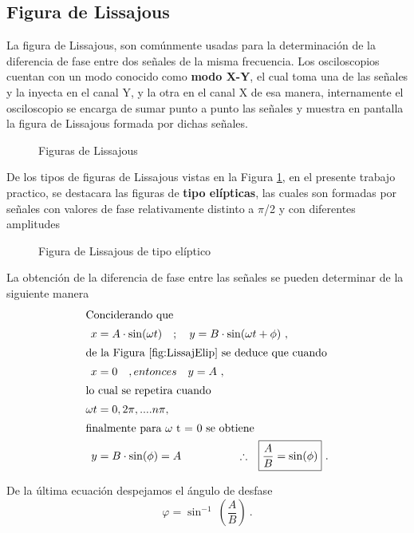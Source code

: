   \subsection{Figura de Lissajous}
               
      La figura de Lissajous, son comúnmente usadas para la determinación de la diferencia
      de fase entre dos señales de la misma frecuencia. Los osciloscopios cuentan con un modo
      conocido como \textbf{modo X-Y}, el cual toma una de las señales y la inyecta en el canal
      Y, y la otra en el canal X de esa manera, internamente el osciloscopio se encarga de 
      sumar punto a punto las señales y muestra en pantalla la figura de Lissajous formada por
      dichas señales.

         \begin{figure}[H]
            \centering
            \caption{Figuras de Lissajous}
            \label{fig:LissajTipos}                 
         \end{figure}

      De los tipos de figuras de Lissajous vistas en la Figura \ref{fig:LissajTipos}, 
      en el presente trabajo practico, se destacara las figuras de \textbf{tipo elípticas}, 
      las cuales son formadas por señales con valores de fase relativamente distinto a $\pi$/2 
      y con diferentes amplitudes

      \begin{figure}[H]
         \centering
         \caption{Figura de Lissajous de tipo elíptico}
         \label{fig:LissajElip}           
      \end{figure}

      La obtención de la diferencia de fase entre las señales se pueden determinar de la
      siguiente manera
      \begin{align}
         \intertext{Conciderando que}
         x &= A\cdot \sin(\omega t) \hspace{10pt} ; \hspace{10pt} y = B\cdot \sin(\omega t + \phi) \ , \notag \\ 
         \intertext{de la Figura \ref{fig:LissajElip} se deduce que cuando}
         x &= 0 \hspace{10pt} , entonces \hspace{10pt} y = A \ , \notag \\
         \intertext{lo cual se repetira cuando}
         \omega t &= 0, 2\pi, .... n\pi, \notag \\
         \intertext{finalmente para \( \omega \) t = 0 se obtiene}
         y &= B\cdot \sin(\phi) = A \hspace{50pt} \therefore \Aboxed{\dfrac{A}{B} = \sin(\phi)} \ . \notag 
      \end{align}
      
      \noindent De la última ecuación despejamos el ángulo de desfase
      \begin{equation}
         \boxed{\varphi = \sin^{-1}\ \left(\dfrac{A}{B} \right)}   \ . \label{eqn:AngDeDesf}   
      \end{equation}

